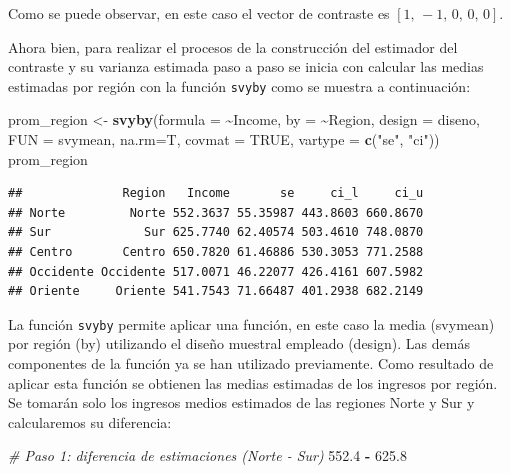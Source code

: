 \documentclass[
  spanish,
  12pt,
]{book}
\newenvironment{Shaded}{\begin{snugshade}}{\end{snugshade}}
\newcommand{\AttributeTok}[1]{\textcolor[rgb]{0.13,0.29,0.53}{#1}}
\newcommand{\CommentTok}[1]{\textcolor[rgb]{0.56,0.35,0.01}{\textit{#1}}}
\newcommand{\ConstantTok}[1]{\textcolor[rgb]{0.56,0.35,0.01}{#1}}
\newcommand{\FloatTok}[1]{\textcolor[rgb]{0.00,0.00,0.81}{#1}}
\newcommand{\FunctionTok}[1]{\textcolor[rgb]{0.13,0.29,0.53}{\textbf{#1}}}
\newcommand{\NormalTok}[1]{#1}
\newcommand{\OtherTok}[1]{\textcolor[rgb]{0.56,0.35,0.01}{#1}}
\newcommand{\SpecialCharTok}[1]{\textcolor[rgb]{0.81,0.36,0.00}{\textbf{#1}}}
\newcommand{\StringTok}[1]{\textcolor[rgb]{0.31,0.60,0.02}{#1}}
\begin{document}
Como se puede observar, en este caso el vector de contraste es \(\left[1,\,-1,\,0,\,0,\,0\right]\).

Ahora bien, para realizar el procesos de la construcción del estimador del contraste y su varianza estimada paso a paso se inicia con calcular las medias estimadas por región con la función \texttt{svyby} como se muestra a continuación:

\begin{Shaded}
\begin{Highlighting}[]
\NormalTok{prom\_region }\OtherTok{\textless{}{-}} \FunctionTok{svyby}\NormalTok{(}\AttributeTok{formula =} \SpecialCharTok{\textasciitilde{}}\NormalTok{Income,}
                      \AttributeTok{by =} \SpecialCharTok{\textasciitilde{}}\NormalTok{Region,}
                      \AttributeTok{design =}\NormalTok{ diseno,}
                      \AttributeTok{FUN =}\NormalTok{ svymean,}
                      \AttributeTok{na.rm=}\NormalTok{T,}
                      \AttributeTok{covmat =} \ConstantTok{TRUE}\NormalTok{,}
                      \AttributeTok{vartype =} \FunctionTok{c}\NormalTok{(}\StringTok{"se"}\NormalTok{, }\StringTok{"ci"}\NormalTok{))}
\NormalTok{prom\_region}
\end{Highlighting}
\end{Shaded}

\begin{verbatim}
##              Region   Income       se     ci_l     ci_u
## Norte         Norte 552.3637 55.35987 443.8603 660.8670
## Sur             Sur 625.7740 62.40574 503.4610 748.0870
## Centro       Centro 650.7820 61.46886 530.3053 771.2588
## Occidente Occidente 517.0071 46.22077 426.4161 607.5982
## Oriente     Oriente 541.7543 71.66487 401.2938 682.2149
\end{verbatim}

La función \texttt{svyby} permite aplicar una función, en este caso la media (svymean) por región (by) utilizando el diseño muestral empleado (design). Las demás componentes de la función ya se han utilizado previamente. Como resultado de aplicar esta función se obtienen las medias estimadas de los ingresos por región. Se tomarán solo los ingresos medios estimados de las regiones Norte y Sur y calcularemos su diferencia:

\begin{Shaded}
\begin{Highlighting}[]
\CommentTok{\# Paso 1: diferencia de estimaciones (Norte {-} Sur)}
\FloatTok{552.4} \SpecialCharTok{{-}} \FloatTok{625.8}
\end{Highlighting}
\end{Shaded}
\end{document}
